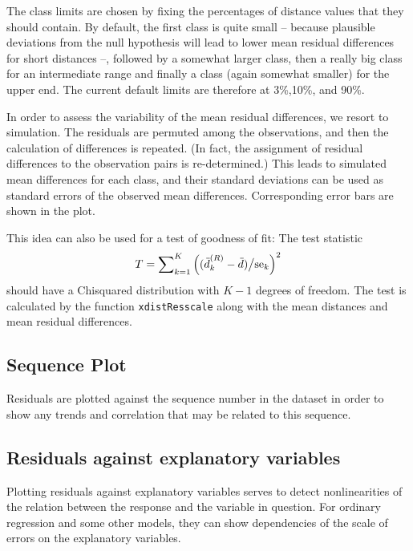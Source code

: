 \documentclass{article}
\providecommand{\sups}[1]{^{(#1)}}
\providecommand{\wb}[1]{{}\if Y#1\overline{Y}\else
\kern0.2em\overline{\kern-0.2em#1}\fi}
\begin{document}
The class limits are chosen by fixing the percentages of distance values
that they should contain. By default, the first class is quite small -- 
because plausible deviations from the null hypothesis will lead to lower
mean residual differences for short distances --, followed by a somewhat
larger class, then a really big class for an intermediate range and finally
a class (again somewhat smaller) for the upper end. 
The current default limits are therefore at 3\%,10\%, and 90\%. 

In order to assess the variability of the mean residual differences,
we resort to simulation. The residuals are permuted among the observations,
and then the calculation of differences is repeated.
(In fact, the assignment of residual differences to the observation pairs 
is re-determined.) This leads to simulated mean differences for each class,
and their standard deviations can be used as standard errors of the 
observed mean differences. Corresponding error bars are shown in the
plot. 

This idea can also be used for a test of goodness of fit: The test
statistic 
$$
  T = \sum\nolimits_{k=1}^K \left((\wb d\sups R_k-\wb d)\big/\mbox{se}_k\right)^2
$$
should have a Chisquared distribution with $K-1$ degrees of freedom.
The test is calculated by the function \texttt{xdistResscale} along with
the mean distances and mean residual differences.

\subsection{Sequence Plot}
Residuals are plotted against the sequence number in the dataset in order
to show any trends and correlation that may be related to this sequence.



\subsection{Residuals against explanatory variables}
Plotting residuals against explanatory variables serves to detect
nonlinearities of the relation between the response and the variable in
question. 
For ordinary regression and some other models, they can show dependencies
of the scale of errors on the explanatory variables.
\end{document}
